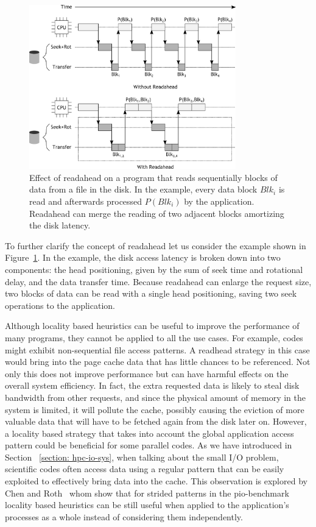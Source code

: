 \begin{figure}[!htb]
\centering
\includegraphics[width=0.8\textwidth]{figures/readahead}
\caption{Effect of readahead on a program that reads sequentially blocks of data from a file in the disk. In the example, every data block $Blk_i$ is read and afterwards processed $P(Blk_i)$ by the application.
Readahead can merge the reading of two adjacent blocks amortizing the disk latency.}
\label{figure: readahead}
\end{figure}

To further clarify the concept of readahead let us consider the example shown in Figure~\ref{figure: readahead}. In the example, the disk access latency is broken down into two components: the head positioning, given by the 
sum of seek time and rotational delay, and the data transfer time. Because readahead can enlarge the request size, two blocks of data can be read with a single head positioning, saving two seek operations to the application.

Although locality based heuristics can be useful to improve the performance of many programs, they cannot be applied to all the use cases. For example, codes might exhibit non-sequential file access patterns. A readhead 
strategy in this case would bring into the page cache data that has little chances to be referenced. Not only this does not improve performance but can have harmful effects on the overall system efficiency. In fact, the extra 
requested data is likely to steal disk bandwidth from other requests, and since the physical amount of memory in the system is limited, it will pollute the cache, possibly causing the eviction of more valuable data that will 
have to be fetched again from the disk later on. However, a locality based strategy that takes into account the global application access pattern could be beneficial for some parallel codes. As we have introduced in Section
~\ref{section: hpc-io-sys}, when talking about the small I/O problem, scientific codes often access data using a regular pattern that can be easily exploited to effectively bring data into the cache. This observation is 
explored by Chen and Roth~\cite{ChenR10} whom show that for strided patterns in the pio-benchmark~\cite{shorter2003} locality based heuristics can be still useful when applied to the application's processes as a whole instead 
of considering them independently.

